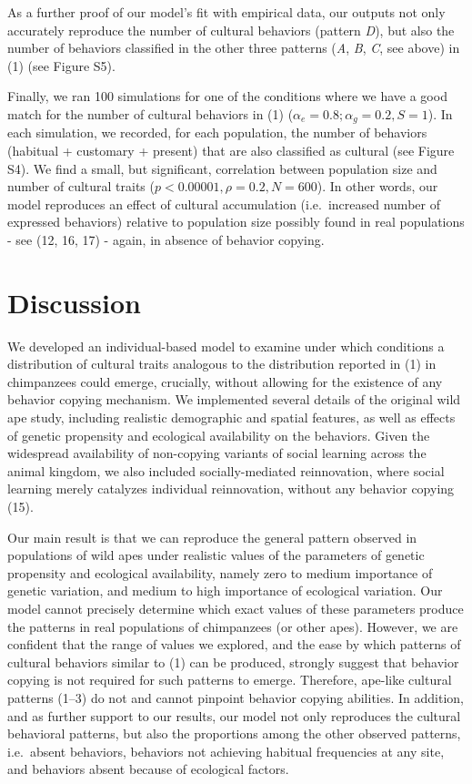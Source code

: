 \documentclass[9pt,twocolumn,twoside,]{pnas-new}
\begin{document}
As a further proof of our model's fit with empirical data, our outputs
not only accurately reproduce the number of cultural behaviors (pattern
\emph{D}), but also the number of behaviors classified in the other
three patterns (\emph{A}, \emph{B}, \emph{C}, see above) in (1) (see
Figure S5).

Finally, we ran 100 simulations for one of the conditions where we have
a good match for the number of cultural behaviors in (1)
(\(\alpha_e=0.8;\alpha_g=0.2, S=1\)). In each simulation, we recorded,
for each population, the number of behaviors (habitual + customary +
present) that are also classified as cultural (see Figure S4). We find a
small, but significant, correlation between population size and number
of cultural traits (\(p<0.00001,\rho=0.2,N=600\)). In other words, our
model reproduces an effect of cultural accumulation (i.e.~increased
number of expressed behaviors) relative to population size possibly
found in real populations - see (12, 16, 17) - again, in absence of
behavior copying.

\section*{Discussion}\label{discussion}

We developed an individual-based model to examine under which conditions
a distribution of cultural traits analogous to the distribution reported
in (1) in chimpanzees could emerge, crucially, without allowing for the
existence of any behavior copying mechanism. We implemented several
details of the original wild ape study, including realistic demographic
and spatial features, as well as effects of genetic propensity and
ecological availability on the behaviors. Given the widespread
availability of non-copying variants of social learning across the
animal kingdom, we also included socially-mediated reinnovation, where
social learning merely catalyzes individual reinnovation, without any
behavior copying (15).

Our main result is that we can reproduce the general pattern observed in
populations of wild apes under realistic values of the parameters of
genetic propensity and ecological availability, namely zero to medium
importance of genetic variation, and medium to high importance of
ecological variation. Our model cannot precisely determine which exact
values of these parameters produce the patterns in real populations of
chimpanzees (or other apes). However, we are confident that the range of
values we explored, and the ease by which patterns of cultural behaviors
similar to (1) can be produced, strongly suggest that behavior copying
is not required for such patterns to emerge. Therefore, ape-like
cultural patterns (1--3) do not and cannot pinpoint behavior copying
abilities. In addition, and as further support to our results, our model
not only reproduces the cultural behavioral patterns, but also the
proportions among the other observed patterns, i.e.~absent behaviors,
behaviors not achieving habitual frequencies at any site, and behaviors
absent because of ecological factors.
\end{document}
